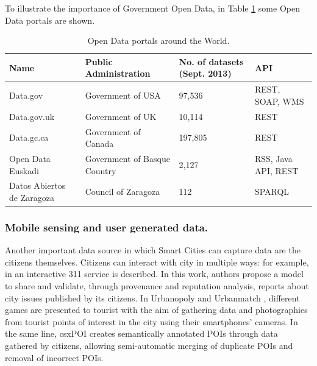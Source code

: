 To illustrate the importance of Government Open Data, in Table \ref{tab:open data portals} some Open Data portals are shown.

    \begin{table}
        \center{}
        \caption{Open Data portals around the World.}
        \begin{tabular}{|p{2cm}|p{3cm}|p{2.5cm}|p{2cm}|}
            \hline
            \textbf{Name} & \textbf{Public Administration} & \textbf{No. of datasets (Sept. 2013)} & \textbf{API} \\
            \hline \hline
            Data.gov & Government of USA & 97,536 & REST, SOAP, WMS\\
            \hline
            Data.gov.uk & Government of UK & 10,114 & REST \\
            \hline
            Data.gc.ca & Government of Canada & 197,805 & REST \\
            \hline
            Open Data Euskadi & Government of Basque Country & 2,127 & RSS, Java API, REST \\
            \hline
            Datos Abiertos de Zaragoza & Council of Zaragoza & 112 & SPARQL \\
            \hline
        \end{tabular}
        \label{tab:open data portals}
    \end{table}

\subsubsection{Mobile sensing and user generated data.}  Another important data source in which Smart Cities can capture data are the citizens themselves. Citizens can interact with city in multiple ways: for example, in \cite{emalditrust} an interactive 311 service is described. In this work, authors propose a model to share and validate, through provenance  and reputation analysis, reports about city issues published by its citizens. In Urbanopoly \cite{celino_urbanopoly_2012} and Urbanmatch \cite{celino_urbanmatch_2012}, different games are presented to tourist with the aim of gathering data and photographies from tourist points of interest in the city using their smartphones' cameras. In the same line, csxPOI \cite{braun_collaborative_2010} creates semantically annotated POIs through data gathered by citizens, allowing semi-automatic merging of duplicate POIs and removal of incorrect POIs.

